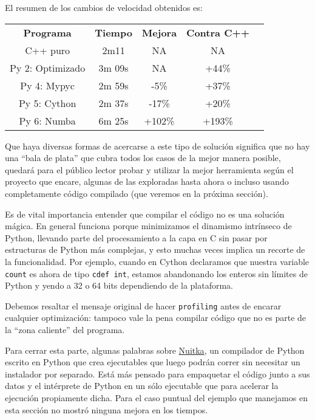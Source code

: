 El resumen de los cambios de velocidad obtenidos es:

\begin{center}
 \begin{tabular} {ccccc} 
 \toprule
  \textbf{Programa} & \textbf{Tiempo} & \textbf{Mejora} & \textbf{Contra C++} \\ 
  C++ puro & 2m11 & NA & NA \\
  Py 2: Optimizado & 3m 09s & NA & +44\% \\
  Py 4: Mypyc & 2m 59s & -5\% & +37\% \\
  Py 5: Cython & 2m 37s & -17\% & +20\% \\
  Py 6: Numba & 6m 25s & +102\% & +193\% \\
  \bottomrule
 \end{tabular}
\end{center}

Que haya diversas formas de acercarse a este tipo de solución significa que no hay una ``bala de plata'' que cubra todos los casos de la mejor manera posible, quedará para el público lector probar y utilizar la mejor herramienta según el proyecto que encare, algunas de las exploradas hasta ahora o incluso usando completamente código compilado (que veremos en la próxima sección).

Es de vital importancia entender que compilar el código no es una solución mágica. En general funciona porque minimizamos el dinamismo intrínseco de Python, llevando parte del procesamiento a la capa en C sin pasar por estructuras de Python más complejas, y esto muchas veces implica un recorte de la funcionalidad. Por ejemplo, cuando en Cython declaramos que nuestra variable \texttt{count} es ahora de tipo \texttt{cdef int}, estamos abandonando los enteros sin límites de Python y yendo a 32 o 64 bits dependiendo de la plataforma.

Debemos resaltar el mensaje original de hacer \texttt{profiling} antes de encarar cualquier optimización: tampoco vale la pena compilar código que no es parte de la ``zona caliente'' del programa. 

Para cerrar esta parte, algunas palabras sobre \href{https://nuitka.net}{Nuitka}, un compilador de Python escrito en Python que crea ejecutables que luego podrán correr sin necesitar un instalador por separado. Está más pensado para empaquetar el código junto a sus datos y el intérprete de Python en un sólo ejecutable que para acelerar la ejecución propiamente dicha. Para el caso puntual del ejemplo que manejamos en esta sección no mostró ninguna mejora en los tiempos.


